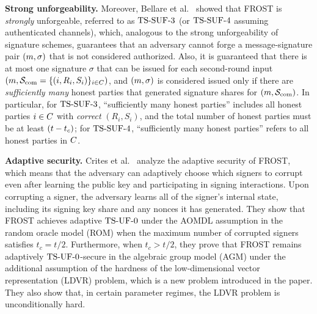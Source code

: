 \medskip
\textbf{Strong unforgeability.} Moreover, Bellare et al.~\cite{BellareCKMTZ22} showed that FROST is \emph{strongly} unforgeable, referred to as $\mathrm{TS}\mbox{-}\mathrm{SUF}\mbox{-}{3}$ (or $\mathrm{TS}\mbox{-}\mathrm{SUF}\mbox{-}{4}$ assuming authenticated channels), which, analogous to the strong unforgeability of signature schemes, guarantees that an adversary cannot forge a message-signature pair $(m,\sigma)$ that is not considered  authorized.
Also, it is guaranteed that there is at most one signature $\sigma$ that can be issued for each second-round input $(m, \mathcal{S}_{\rm com}=\{ (i, R_{i}, S_{i})\}_{i \in C})$, and $(m, \sigma)$ is considered issued only if there are \emph{sufficiently many} honest parties that generated signature shares for $(m, \mathcal{S}_{\rm com})$.
In particular, for $\mathrm{TS}\mbox{-}\mathrm{SUF}\mbox{-}{3}$, ``sufficiently many honest parties'' includes all honest parties $i\in C$ with \emph{correct} $(R_{i}, S_{i})$, and the total number of honest parties must be at least $(t - t_c)$; for $\mathrm{TS}\mbox{-}\mathrm{SUF}\mbox{-}{4}$, ``sufficiently many honest parties'' refers to all honest parties in $C$.

\medskip
\textbf{Adaptive security.} Crites et al.~\cite{adp-frost} analyze the adaptive security of FROST, which means that the adversary can adaptively choose which signers to corrupt even after learning the public key and participating in signing interactions. Upon corrupting a signer, the adversary learns all of the signer's internal state, including its signing key share and any nonces it has generated. They show that FROST achieves adaptive $\mathrm{TS}\mbox{-}\mathrm{UF}\mbox{-}{0}$ under the AOMDL assumption in the random oracle model (ROM) when the maximum number of corrupted signers satisfies $t_c = t/2$. Furthermore, when $t_c > t/2$, they prove that FROST remains adaptively $\mathrm{TS}\mbox{-}\mathrm{UF}\mbox{-}{0}$-secure in the algebraic group model (AGM) under the additional assumption of the hardness of the low-dimensional vector representation (LDVR) problem, which is a new problem introduced in the paper. They also show that, in certain parameter regimes, the LDVR problem is unconditionally hard.



